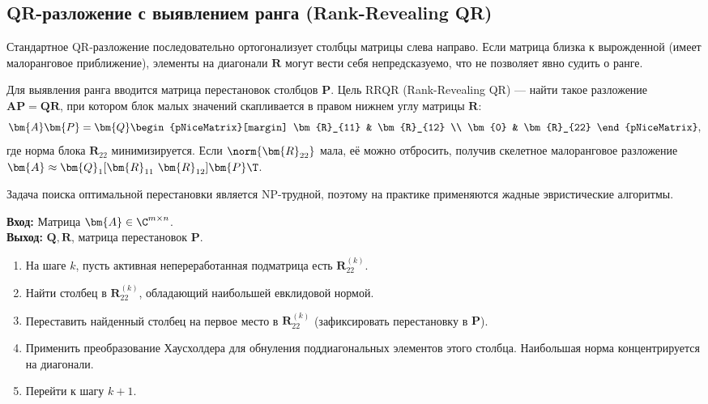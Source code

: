 \subsection{QR-разложение с выявлением ранга (Rank-Revealing QR)}
\label{sec:rrqr}

Стандартное QR-разложение последовательно ортогонализует столбцы матрицы слева направо. Если матрица близка к вырожденной (имеет малоранговое приближение), элементы на диагонали $\bm{R}$ могут вести себя непредсказуемо, что не позволяет явно судить о ранге.

Для выявления ранга вводится матрица перестановок столбцов $\bm{P}$. Цель RRQR (Rank-Revealing QR) — найти такое разложение $\bm{A}\bm{P} = \bm{Q}\bm{R}$, при котором блок малых значений скапливается в правом нижнем углу матрицы $\bm{R}$:
\begin{equation}
    \bm{A}\bm{P} = \bm{Q} 
    \begin{pNiceMatrix}[margin]
        \bm{R}_{11} & \bm{R}_{12} \\
        \bm{0}      & \bm{R}_{22}
    \end{pNiceMatrix},
    \label{eq:rrqr_structure}
\end{equation}
где норма блока $\bm{R}_{22}$ минимизируется. Если $\norm{\bm{R}_{22}}$ мала, её можно отбросить, получив скелетное малоранговое разложение $\bm{A} \approx \bm{Q}_1 [\bm{R}_{11}\ \bm{R}_{12}] \bm{P}\T$. 

Задача поиска оптимальной перестановки является NP-трудной, поэтому на практике применяются жадные эвристические алгоритмы.

\begin{tcbalgorithmbox}
\label{alg:rrqr}
    \textbf{Вход:} Матрица $\bm{A} \in \C^{m \times n}$.\\
    \textbf{Выход:} $\bm{Q}, \bm{R}$, матрица перестановок $\bm{P}$.
    \begin{enumerate}
        \item На шаге $k$, пусть активная непереработанная подматрица есть $\bm{R}_{22}^{(k)}$.
        \item Найти столбец в $\bm{R}_{22}^{(k)}$, обладающий наибольшей евклидовой нормой.
        \item Переставить найденный столбец на первое место в $\bm{R}_{22}^{(k)}$ (зафиксировать перестановку в $\bm{P}$).
        \item Применить преобразование Хаусхолдера для обнуления поддиагональных элементов этого столбца. Наибольшая норма концентрируется на диагонали.
        \item Перейти к шагу $k+1$.
    \end{enumerate}
\end{tcbalgorithmbox}

